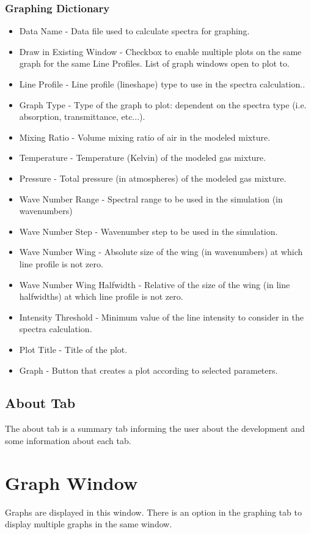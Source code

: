 \documentclass[12pt]{article}
\begin{document}
\subsubsection{Graphing Dictionary}
\begin{itemize}
\item Data Name - Data file used to calculate spectra for graphing.
\item Draw in Existing Window - Checkbox to enable multiple plots on the same graph for the same Line Profiles. List of graph windows open to plot to.
\item Line Profile - Line profile (lineshape) type to use in the spectra calculation..
\item Graph Type - Type of the graph to plot: dependent on the spectra type (i.e. absorption, transmittance, etc...).
\item Mixing Ratio - Volume mixing ratio of air in the modeled mixture.
\item Temperature - Temperature (Kelvin) of the modeled gas mixture.
\item Pressure - Total pressure (in atmospheres) of the modeled gas mixture.
\item Wave Number Range - Spectral range to be used in the simulation (in wavenumbers)
\item Wave Number Step - Wavenumber step to be used in the simulation.
\item Wave Number Wing - Absolute size of the wing (in wavenumbers) at which line profile is not zero.
\item Wave Number Wing Halfwidth - Relative of the size of the wing (in line halfwidths) at which line profile is not zero.
\item Intensity Threshold - Minimum value of the line intensity to consider in the spectra calculation.
\item Plot Title - Title of the plot.
\item Graph - Button that creates a plot according to selected parameters.
\end{itemize}

\subsection{About Tab}
The about tab is a summary tab informing the user about the development and some information about each tab.

\section{Graph Window}
Graphs are displayed in this window. There is an option in the graphing tab to display multiple graphs in the same window.
\end{document}
